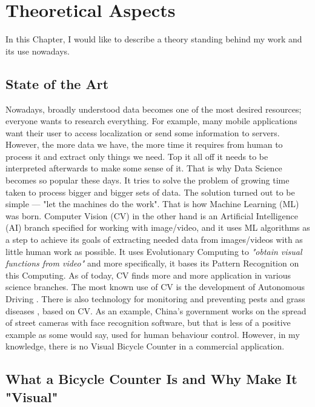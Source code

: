 \chapter{Theoretical Aspects}
\label{cha:theorethicalAspects}

In this Chapter, I would like to describe a theory standing behind my work and its use nowadays.

\section{State of the Art}
\label{sec:stateOfTheArt}

Nowadays, broadly understood data becomes one of the most desired resources; everyone wants to research everything. For example, many mobile applications want their user to access localization or send some information to servers. However, the more data we have, the more time it requires from human to process it and extract only things we need. Top it all off it needs to be interpreted afterwards to make some sense of it. That is why Data Science \cite{dataScience} becomes so popular these days. It tries to solve the problem of growing time taken to process bigger and bigger sets of data. The solution turned out to be simple --- "let the machines do the work". That is how Machine Learning (ML) was born. Computer Vision \cite{cv} (CV) in the other hand is an Artificial Intelligence (AI) branch specified for working with image/video, and it uses ML algorithms as a step to achieve its goals of extracting needed data from images/videos with as little human work as possible. It uses Evolutionary Computing \cite{cv} to \textit{"obtain visual functions from video"} \cite{cv} and more specifically, it bases its Pattern Recognition \cite{cv} on this Computing. As of today, CV finds more and more application in various science branches. The most known use of CV is the development of Autonomous Driving \cite{ad}. There is also technology for monitoring and preventing pests and grass diseases \cite{appResearch}, based on CV. As an example, China's government works on the spread of street cameras with face recognition \cite{face} software, but that is less of a positive example as some would say, used for human behaviour control. However, in my knowledge, there is no Visual Bicycle Counter in a commercial application.

\section{What a Bicycle Counter Is and Why Make It "Visual"}
\label{sec:why}

